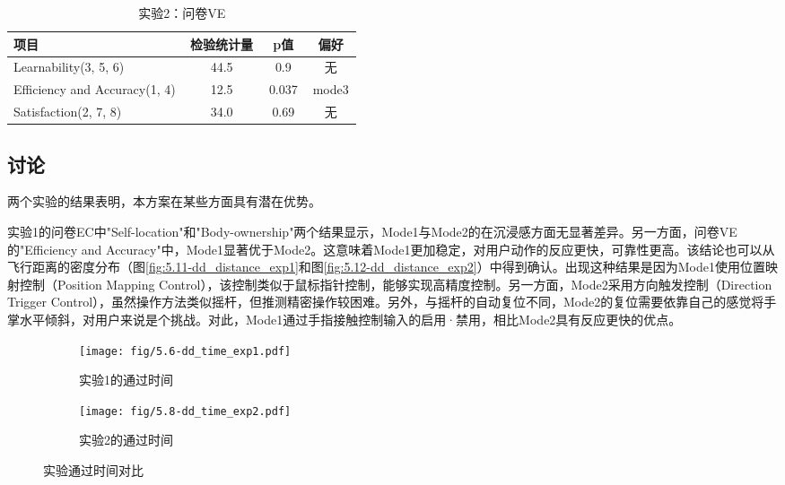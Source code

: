\begin{table}[htbp]
    \vspace{0.5cm}

    \begin{minipage}{\textwidth}
        \centering
        \caption{实验2：问卷VE}
        \begin{tabular}{@{}p{0.5\linewidth}ccc@{}}
            \toprule
            \textbf{项目}                 & \textbf{检验统计量} & \textbf{p值} & \textbf{偏好} \\ \midrule
            Learnability(3, 5, 6)         & 44.5            & 0.9          & 无           \\
            Efficiency and Accuracy(1, 4) & 12.5            & 0.037        & mode3       \\
            Satisfaction(2, 7, 8)         & 34.0            & 0.69         & 无           \\ \bottomrule
        \end{tabular}
    \end{minipage}
\end{table}

\subsection{讨论}

两个实验的结果表明，本方案在某些方面具有潜在优势。

实验1的问卷EC中"Self-location"和"Body-ownership"两个结果显示，Mode1与Mode2的在沉浸感方面无显著差异。另一方面，问卷VE的"Efficiency and Accuracy"中，Mode1显著优于Mode2。这意味着Mode1更加稳定，对用户动作的反应更快，可靠性更高。该结论也可以从飞行距离的密度分布（图\ref{fig:5.11-dd_distance_exp1}和图\ref{fig:5.12-dd_distance_exp2}）中得到确认。出现这种结果是因为Mode1使用位置映射控制（Position Mapping Control），该控制类似于鼠标指针控制，能够实现高精度控制。另一方面，Mode2采用方向触发控制（Direction Trigger Control），虽然操作方法类似摇杆，但推测精密操作较困难。另外，与摇杆的自动复位不同，Mode2的复位需要依靠自己的感觉将手掌水平倾斜，对用户来说是个挑战。对此，Mode1通过手指接触控制输入的启用·禁用，相比Mode2具有反应更快的优点。



\begin{figure}[htbp]
    \centering
    \begin{subfigure}{\textwidth}
    \texttt{[image: fig/5.6-dd\_time\_exp1.pdf]}
    \centering
    \caption{实验1的通过时间}
    \label{fig:5.6-dd_time_exp1}
    \end{subfigure}
    
    \begin{subfigure}{\textwidth}
    \texttt{[image: fig/5.8-dd\_time\_exp2.pdf]}
    \centering
    \caption{实验2的通过时间}
    \label{fig:5.8-dd_time_exp2}
    \end{subfigure}
        \caption{实验通过时间对比}
    \label{fig:experiments_time}
\end{figure}

